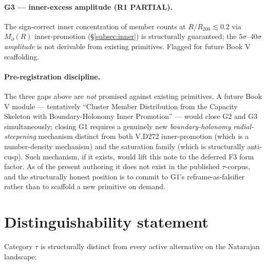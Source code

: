\documentclass{pantarhei-researchnote}
\newcommand{\Mpa}{M_{\partial}}                 %
\newcommand{\Rtwohun}{R_{200}}
\begin{document}
\paragraph{G3 — inner-excess amplitude (R1 PARTIAL).}
The sign-correct inner concentration of member counts at $R/\Rtwohun
\lesssim 0.2$ via $\Mpa(R)$ inner-promotion (\S\ref{subsec:inner})
is structurally guaranteed; the $5\sigma$--$40\sigma$ \emph{amplitude}
is not derivable from existing primitives. Flagged for future Book V
scaffolding.

\paragraph{Pre-registration discipline.}
The three gaps above are \emph{not} promised against existing primitives.
A future Book V module --- tentatively ``Cluster Member Distribution from
the Capacity Skeleton with Boundary-Holonomy Inner Promotion'' --- would
close G2 and G3 simultaneously; closing G1 requires a genuinely new
\emph{boundary-holonomy radial-steepening} mechanism distinct from both
V.D272 inner-promotion (which is a number-density mechanism) and the
saturation family (which is structurally anti-cusp). Such mechanism, if
it exists, would lift this note to the deferred F3 form factor. As of
the present authoring it does not exist in the published $\tau$-corpus,
and the structurally honest position is to commit to G1's reframe-as-falsifier rather than to scaffold a new primitive on demand.


\section{Distinguishability statement}\label{sec:distinguish}

Category $\tau$ is structurally distinct from every active alternative on
the Natarajan landscape:
\end{document}
